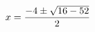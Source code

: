 \documentclass[preview]{standalone}
\begin{document}
\begin{align*}
\special{dvisvgm:raw <g id='unique000'>}x=\frac{-4\pm\sqrt{16-52}}{2}\special{dvisvgm:raw </g>}
\end{align*}
\end{document}
